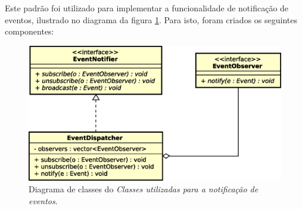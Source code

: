 Este padrão foi utilizado para implementar a funcionalidade de notificação de
eventos, ilustrado no diagrama da figura \ref{fig:diagram:notification}. Para
isto, foram criados os seguintes componentes:

\begin{figure}[htb!]
  \centering
  \includegraphics[scale=0.6]{img/EventNotifier}
  \caption{Diagrama de classes do \textit{Classes utilizadas para a notificação de eventos}.}
\label{fig:diagram:notification}
\end{figure}

